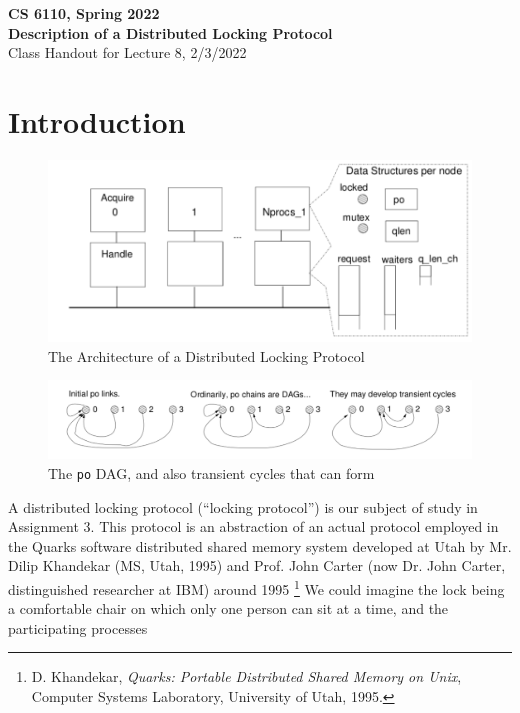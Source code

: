 \documentclass[11pt]{article}
\begin{document}
 
  \begin{center}
  {\Large\bf  {CS 6110, Spring 2022} } \\
  {\bf Description of a Distributed Locking Protocol} \\
  {Class Handout for Lecture 8, 2/3/2022}
  \end{center}

\section{Introduction}
\label{sec:introduction}

\begin{figure}[tbhp]
\centering
\includegraphics[scale=0.4]{fig1.png}
 \caption{The Architecture of a Distributed Locking Protocol}
 \label{fig:locking-prot-arch}
\end{figure}
%
\begin{figure}[tbhp]
\centering
\includegraphics[scale=0.4]{fig2.png}
 \caption{The {\tt po} DAG, and also transient cycles that can form}
 \label{fig:locking-prot-cycles}
\end{figure}
%
A distributed locking protocol (``locking protocol'') is our
subject of study in Assignment 3.
%
This protocol is an abstraction of an actual protocol employed in the Quarks
software distributed shared memory system developed at Utah by Mr. Dilip Khandekar (MS, Utah, 1995) and
Prof. John Carter (now Dr. John Carter, distinguished
researcher at IBM) around 1995 \footnote{D. Khandekar, {\em Quarks: Portable Distributed
    Shared Memory on Unix}, Computer Systems Laboratory, University of
  Utah, 1995.}
%
We could imagine the lock being a comfortable chair on which only one
person can sit at a time, and the participating processes
\end{document}
